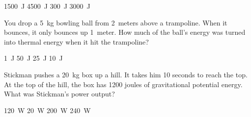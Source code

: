 \documentclass[]{exam}
\begin{document}
\begin{questions}
\begin{minipage}{0.3\textwidth}
    \centering
    \begin{randomizechoices}
        \choice \SI{1500}{J}
        \choice \SI{4500}{J}
        \choice \SI{300}{J}
        \correctchoice \SI{3000}{J}
    \end{randomizechoices}
\end{minipage}%
\begin{minipage}{0.4\textwidth}
    \centering
\end{minipage}

\question
You drop a \SI{5}{kg} bowling ball from \SI{2}{meters} above a trampoline. When it bounces, it only bounces up \SI{1}{meter}. How much of the ball's energy was turned into thermal energy when it hit the trampoline?

\begin{randomizechoices}
    \choice \SI{1}{J}
    \correctchoice \SI{50}{J}
    \choice \SI{25}{J}
    \choice \SI{10}{J}
\end{randomizechoices}

\question
Stickman pushes a \SI{20}{kg} box up a hill. It takes him 10 seconds to reach the top. At the top of the hill, the box has 1200 joules of gravitational potential energy. What was Stickman's power output?

\begin{minipage}{0.3\textwidth}
    \begin{randomizechoices}
        \correctchoice \SI{120}{W}
        \choice \SI{20}{W}
        \choice \SI{200}{W}
        \choice \SI{240}{W}
    \end{randomizechoices}
\end{minipage}%
\begin{minipage}{0.6\textwidth}
\end{minipage}


\end{questions}
\end{document}
